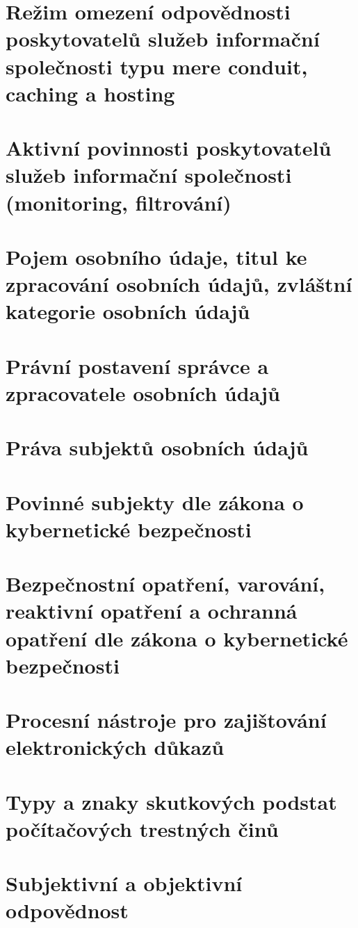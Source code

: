 \section{Režim omezení odpovědnosti poskytovatelů služeb informační společnosti typu mere conduit, caching a hosting}

\clearpage
\section{Aktivní povinnosti poskytovatelů služeb informační společnosti (monitoring, filtrování)}

\clearpage
\section{Pojem osobního údaje, titul ke zpracování osobních údajů, zvláštní kategorie osobních údajů}

\clearpage
\section{Právní postavení správce a zpracovatele osobních údajů}

\clearpage
\section{Práva subjektů osobních údajů}

\clearpage
\section{Povinné subjekty dle zákona o kybernetické bezpečnosti}

\clearpage
\section{Bezpečnostní opatření, varování, reaktivní opatření a ochranná opatření dle zákona o kybernetické bezpečnosti}

\clearpage
\section{Procesní nástroje pro zajištování elektronických důkazů}

\clearpage
\section{Typy a znaky skutkových podstat počítačových trestných činů}

\clearpage
\section{Subjektivní a objektivní odpovědnost}
